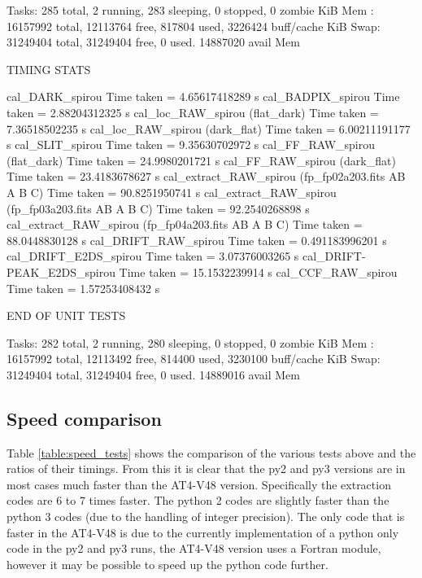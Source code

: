 \begin{cmdboxprint}
Tasks: 285 total,   2 running, 283 sleeping,   0 stopped,   0 zombie
KiB Mem : 16157992 total, 12113764 free,   817804 used,  3226424 buff/cache
KiB Swap: 31249404 total, 31249404 free,        0 used. 14887020 avail Mem

TIMING STATS

cal_DARK_spirou Time taken = 4.65617418289 s
cal_BADPIX_spirou Time taken = 2.88204312325 s
cal_loc_RAW_spirou (flat_dark) Time taken = 7.36518502235 s
cal_loc_RAW_spirou (dark_flat) Time taken = 6.00211191177 s
cal_SLIT_spirou Time taken = 9.35630702972 s
cal_FF_RAW_spirou (flat_dark) Time taken = 24.9980201721 s
cal_FF_RAW_spirou (dark_flat) Time taken = 23.4183678627 s
cal_extract_RAW_spirou (fp_fp02a203.fits AB A B C) Time taken = 90.8251950741 s
cal_extract_RAW_spirou (fp_fp03a203.fits AB A B C) Time taken = 92.2540268898 s
cal_extract_RAW_spirou (fp_fp04a203.fits AB A B C) Time taken = 88.0448830128 s
cal_DRIFT_RAW_spirou Time taken = 0.491183996201 s
cal_DRIFT_E2DS_spirou Time taken = 3.07376003265 s
cal_DRIFT-PEAK_E2DS_spirou Time taken = 15.1532239914 s
cal_CCF_RAW_spirou Time taken = 1.57253408432 s

END OF UNIT TESTS

Tasks: 282 total,   2 running, 280 sleeping,   0 stopped,   0 zombie
KiB Mem : 16157992 total, 12113492 free,   814400 used,  3230100 buff/cache
KiB Swap: 31249404 total, 31249404 free,        0 used. 14889016 avail Mem
\end{cmdboxprint}

\newpage

\subsection{Speed comparison}

Table \ref{table:speed_tests} shows the comparison of the various tests above and the ratios of their timings. From this it is clear that the py2 and py3 versions are in most cases much faster than the AT4-V48 version. Specifically the extraction codes are 6 to 7 times faster. The python 2 codes are slightly faster than the python 3 codes (due to the handling of integer precision). The only code that is faster in the AT4-V48 is \calCCF due to the currently implementation of a python only code in the py2 and py3 runs, the AT4-V48 version uses a Fortran module, however it may be possible to speed up the python code further.

